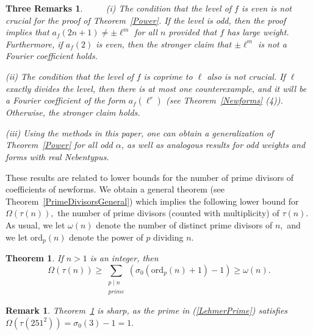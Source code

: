 \documentclass[12pt]{amsart}
\newtheorem*{remark}{Remark}
\newtheorem*{ThreeRemarks}{Three Remarks}
\newtheorem{thm}{Theorem}[section]
\newcommand{\ord}{\mathrm{ord}}
\newcommand{\?}{\color{red}?}
\numberwithin{equation}{section}
\begin{document}
\begin{ThreeRemarks}\ \ \ \  \newline 
\noindent
(i) The condition that the level of $f$  is even  is not crucial  for the proof of Theorem~\ref{Power}.
If the level is odd, then  the proof implies that
$a_f(2n+1)\neq \pm \ell^m$ for all $n$ provided that $f$ has  large weight. Furthermore, if $a_f(2)$ is even, then  the stronger claim that $\pm \ell^m$
is not a Fourier coefficient holds.

\smallskip
\noindent
(ii) The condition that the level of $f$ is coprime to $\ell$  also is not crucial. If $\ell$ exactly divides the level, then there is at most one counterexample, and it will be
a Fourier coefficient of the form $a_f(\ell^r)$ (see Theorem~\ref{Newforms} (4)).
Otherwise, the stronger claim holds.

\smallskip
\noindent
(iii) Using the methods in this paper, one can obtain a generalization of Theorem~\ref{Power} for all odd $\alpha$, as well as analogous results for odd weights and forms with real Nebentypus. 
\end{ThreeRemarks}


These results are related to lower
 bounds for the number of prime divisors
of coefficients of newforms. We obtain a general
theorem (see Theorem~\ref{PrimeDivisorsGeneral}) which implies the following lower bound for $\Omega(\tau(n)),$ the number of prime divisors (counted with multiplicity) of $\tau(n)$. As usual,
we let $\omega(n)$ denote the number of distinct prime divisors of $n,$ and we let $\ord_p(n)$ denote the power of $p$ dividing $n.$

\begin{thm}\label{PrimeDivisors}
If $n>1$ is an integer, then
$$
\Omega(\tau(n))\geq \sum_{\substack{p\mid n\\ prime}}\left ( \sigma_0(\ord_p(n)+1)-1\right)\geq \omega(n).
$$
\end{thm}

\begin{remark}Theorem~\ref{PrimeDivisors} is sharp, as the
prime in (\ref{LehmerPrime})
satisfies $\Omega(\tau(251^2))=\sigma_0(3)-1=1.$
\end{remark}
\end{document}
